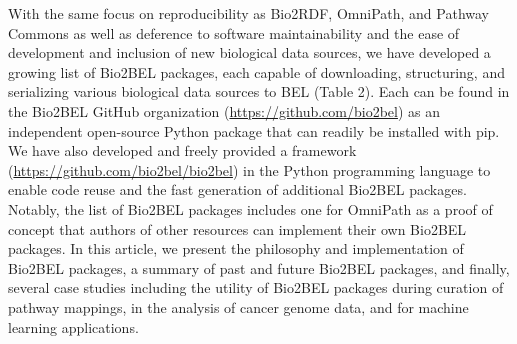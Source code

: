 With the same focus on reproducibility as Bio2RDF, OmniPath, and Pathway Commons as well as deference to software maintainability and the ease of development and inclusion of new biological data sources, we have developed a growing list of Bio2BEL packages, each capable of downloading, structuring, and serializing various biological data sources to BEL (Table 2).
Each can be found in the Bio2BEL GitHub organization (\url{https://github.com/bio2bel}) as an independent open-source Python package that can readily be installed with pip.
We have also developed and freely provided a framework (\url{https://github.com/bio2bel/bio2bel}) in the Python programming language to enable code reuse and the fast generation of additional Bio2BEL packages.
Notably, the list of Bio2BEL packages includes one for OmniPath as a proof of concept that authors of other resources can implement their own Bio2BEL packages.
In this article, we present the philosophy and implementation of Bio2BEL packages, a summary of past and future Bio2BEL packages, and finally, several case studies including the utility of Bio2BEL packages during curation of pathway mappings, in the analysis of cancer genome data, and for machine learning applications.
